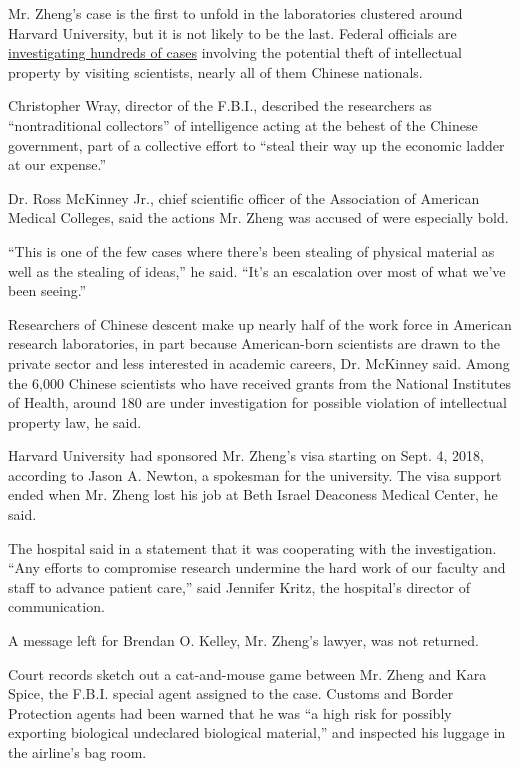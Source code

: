 Mr. Zheng's case is the first to unfold in the laboratories clustered
around Harvard University, but it is not likely to be the last. Federal
officials are
\href{https://www.nytimes.com/2019/11/04/health/china-nih-scientists.html}{investigating
hundreds of cases} involving the potential theft of intellectual
property by visiting scientists, nearly all of them Chinese nationals.

Christopher Wray, director of the F.B.I., described the researchers as
``nontraditional collectors'' of intelligence acting at the behest of
the Chinese government, part of a collective effort to ``steal their way
up the economic ladder at our expense.''

Dr. Ross McKinney Jr., chief scientific officer of the Association of
American Medical Colleges, said the actions Mr. Zheng was accused of
were especially bold.

``This is one of the few cases where there's been stealing of physical
material as well as the stealing of ideas,'' he said. ``It's an
escalation over most of what we've been seeing.''

Researchers of Chinese descent make up nearly half of the work force in
American research laboratories, in part because American-born scientists
are drawn to the private sector and less interested in academic careers,
Dr. McKinney said. Among the 6,000 Chinese scientists who have received
grants from the National Institutes of Health, around 180 are under
investigation for possible violation of intellectual property law, he
said.

Harvard University had sponsored Mr. Zheng's visa starting on Sept. 4,
2018, according to Jason A. Newton, a spokesman for the university. The
visa support ended when Mr. Zheng lost his job at Beth Israel Deaconess
Medical Center, he said.

The hospital said in a statement that it was cooperating with the
investigation. ``Any efforts to compromise research undermine the hard
work of our faculty and staff to advance patient care,'' said Jennifer
Kritz, the hospital's director of communication.

A message left for Brendan O. Kelley, Mr. Zheng's lawyer, was not
returned.

Court records sketch out a cat-and-mouse game between Mr. Zheng and Kara
Spice, the F.B.I. special agent assigned to the case. Customs and Border
Protection agents had been warned that he was ``a high risk for possibly
exporting biological undeclared biological material,'' and inspected his
luggage in the airline's bag room.

